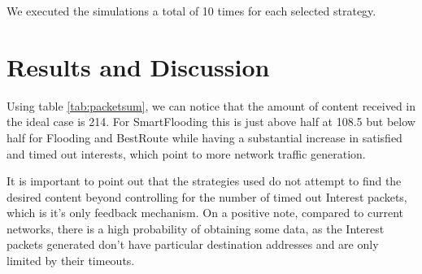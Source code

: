 \documentclass[twocolumn, a4paper]{ieicejsp}
\begin{document}
We executed the simulations a total of 10 times for each selected strategy.

\section{Results and Discussion}

\begin{table}[h]
\centering
{}
\caption{Averaged simulation results}
\label{tab:packetsum}
\end{table}


Using table \ref{tab:packetsum}, we can notice that the amount of content
received in the ideal case is 214. For SmartFlooding this is just above half at
108.5 but below half for Flooding and BestRoute while having a substantial 
increase in satisfied and timed out interests, which point to more network 
traffic generation. 

It is important to point out that the strategies used do not attempt to find
the desired content beyond controlling for the number of timed out Interest
packets, which is it's only feedback mechanism. On a positive note, compared to
current networks, there is a high probability of obtaining some data, as the
Interest packets generated don't have particular destination addresses and are
only limited by their timeouts.
\end{document}
